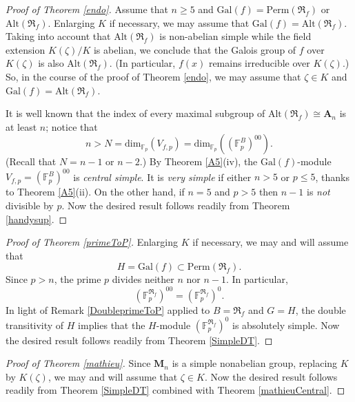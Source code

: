 \documentclass[12pt,a4paper,reqno]{amsart}
\def\Q{{\mathbb Q}}
\def\Z{{\mathbb Z}}
\def\R{{\mathbb R}}
\def\F{{\mathbb F}}
\def\R{{\mathfrak R}}
\def\Gal{\mathrm{Gal}}
\def\Perm{\mathrm{Perm}}
\def\Alt{\mathrm{Alt}}
\def\End{\mathrm{End}}
\def\dim{\mathrm{dim}}
\theoremstyle{definition}
\begin{document}
\begin{proof}[Proof of Theorem \ref{endo}]
Assume that $n \ge 5$ and $\Gal(f)=\Perm(\R_f)$ or $\Alt(\R_f)$.
Enlarging $K$ if necessary, we may assume that $\Gal(f)=\Alt(\R_f)$.
Taking into account that $\Alt(\R_f)$ is non-abelian simple while the field extension $K(\zeta)/K$ is
abelian, we conclude that the Galois group of $f$ over $K(\zeta)$
is also  $\Alt(\R_f)$. (In particular, $f(x)$
remains irreducible over $K(\zeta)$.) So, in the course of the
proof of Theorem \ref{endo}, we may assume that $\zeta
\in K$ and $\Gal(f)=\Alt(\R_f)$.


 It is well known that
the index of every maximal subgroup of $\mathrm{Alt}(\R_f)\cong \mathbf{A}_n$ is at least $n$; notice that
$$n>N=\dim_{\F_p}(V_{f,p})=\dim_{\F_p}\left((\F_p^{B})^{00}\right).$$ (Recall that $N=n-1$ or $n-2$.)
By  Theorem \ref{A5}(iv), the $\Gal(f)$-module $V_{f,p}=(\F_p^{B})^{00}$ is {\sl central simple}.
It is {\sl very simple} if either $n>5$ or $p \le 5$, thanks to  Theorem \ref{A5}(ii).
On the other hand, if $n=5$ and $p>5$ then $n-1$ is {\sl not} divisible by $p$.
Now the desired result follows  readily from Theorem \ref{handysup}.
 
 \end{proof}








\begin{proof}[Proof of Theorem \ref{primeToP}]
Enlarging $K$ if necessary, we may and will assume that 
$$H=\Gal(f)\subset \Perm(\R_f).$$  
 Since $p>n$,
the prime $p$ divides neither $n$ nor $n-1$.
 In particular,
$$(\F_p^{\R_f})^{00}=(\F_p^{\R_f})^{0}.$$ 
In light of Remark \ref{DoubleprimeToP} applied to $B=\R_f$ and $G=H$, the double transitivity of $H$ implies that the $H$-module $(\F_p^{\R_f})^{0}$ is absolutely simple.
Now the desired result follows readily from Theorem \ref{SimpleDT}.
\end{proof}

\begin{proof}[Proof of Theorem \ref{mathieu}]
Since $\mathbf{M}_n$ is a simple nonabelian group, replacing $K$ by $K(\zeta)$, we may and will assume that $\zeta \in K$.
Now the desired result follows readily from   Theorem \ref{SimpleDT} combined with Theorem \ref{mathieuCentral}.





\end{proof}
\end{document}
